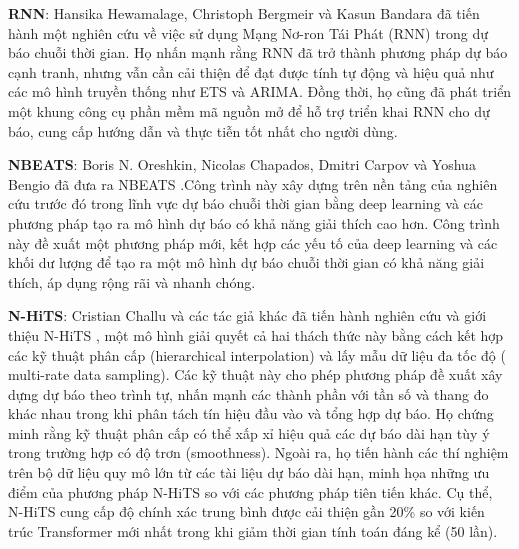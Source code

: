 \par
\textbf{RNN}: 
Hansika Hewamalage, Christoph Bergmeir và Kasun Bandara đã tiến hành một nghiên cứu về việc sử dụng Mạng Nơ-ron Tái Phát (RNN) \cite{b6} trong dự báo chuỗi thời gian. Họ nhấn mạnh rằng RNN đã trở thành phương pháp dự báo cạnh tranh, nhưng vẫn cần cải thiện để đạt được tính tự động và hiệu quả như các mô hình truyền thống như ETS và ARIMA. Đồng thời, họ cũng đã phát triển một khung công cụ phần mềm mã nguồn mở để hỗ trợ triển khai RNN cho dự báo, cung cấp hướng dẫn và thực tiễn tốt nhất cho người dùng.
\par
\textbf{NBEATS}: Boris N. Oreshkin, Nicolas Chapados, Dmitri Carpov và Yoshua Bengio đã đưa ra NBEATS \cite{b7}.Công trình này xây dựng trên nền tảng của nghiên cứu trước đó trong lĩnh vực dự báo chuỗi thời gian bằng deep learning và các phương pháp tạo ra mô hình dự báo có khả năng giải thích cao hơn. Công trình này đề xuất một phương pháp mới, kết hợp các yếu tố của deep learning và các khối dư lượng để tạo ra một mô hình dự báo chuỗi thời gian có khả năng giải thích, áp dụng rộng rãi và nhanh chóng.
\par
\textbf{N-HiTS}: Cristian Challu và các tác giả khác đã tiến hành nghiên cứu và giới thiệu N-HiTS \cite{b8}, một mô hình giải quyết cả hai thách thức này bằng cách kết hợp các kỹ thuật phân cấp (hierarchical interpolation) và lấy mẫu dữ liệu đa tốc độ ( multi-rate data sampling). Các kỹ thuật này cho phép phương pháp đề xuất xây dựng dự báo theo trình tự, nhấn mạnh các thành phần với tần số và thang đo khác nhau trong khi phân tách tín hiệu đầu vào và tổng hợp dự báo. Họ chứng minh rằng kỹ thuật phân cấp có thể xấp xỉ hiệu quả các dự báo dài hạn tùy ý trong trường hợp có độ trơn (smoothness). Ngoài ra, họ tiến hành các thí nghiệm trên bộ dữ liệu quy mô lớn từ các tài liệu dự báo dài hạn, minh họa những ưu điểm của phương pháp N-HiTS so với các phương pháp tiên tiến khác. Cụ thể, N-HiTS cung cấp độ chính xác trung bình được cải thiện gần 20\% so với kiến trúc Transformer mới nhất trong khi giảm thời gian tính toán đáng kể (50 lần).